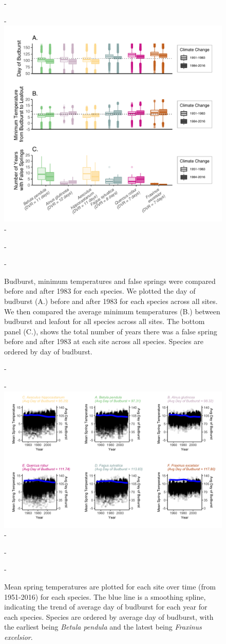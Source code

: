 \documentclass{article}\usepackage[]{graphicx}\usepackage[]{color}
\begin{document}
{\begin{figure} [H]
  -\begin{center}
  -\includegraphics[width=12cm]{..//figures/Boxplot_BBTminFS_dvr.pdf}
  -\caption{Budburst, minimum temperatures and false springs were compared before and after 1983 for each species. We plotted the day of budburst (A.) before and after 1983 for each species across all sites. We then compared the average minimum temperatures (B.) between budburst and leafout for all species across all sites. The bottom panel (C.), shows the total number of years there was a false spring before and after 1983 at each site across all species. Species are ordered by day of budburst.  }\label{fig:boxfs}
  -\end{center}
  -\end{figure}}
  
{\begin{figure} [H]
  -\begin{center}
  -\includegraphics[width=12cm]{..//figures/MSTBB_bySpp.png}
  -\caption{Mean spring temperatures are plotted for each site over time (from 1951-2016) for each species. The blue line is a smoothing spline, indicating the trend of average day of budburst for each year for each species. Species are ordered by average day of budburst, with the earliest being \textit{Betula pendula} and the latest being \textit{Fraxinus excelsior}. }\label{fig:mst}
  -\end{center}
  -\end{figure}}
  
\end{document}
